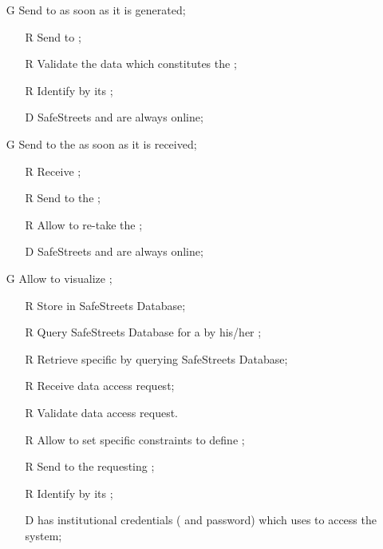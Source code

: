 \documentclass[../../../rasd.tex]{subfiles}
\begin{document}
\begin{itemize}
	\item[G\subs{2}]Send  to  as soon as it is generated;
	\begin{itemize}
		\item[R\subs{11}]Send  to ;
		\item[R\subs{15}]Validate the data which constitutes the ;
		\item[R\subs{31}]Identify  by its ;
		\\
		\item[D\subs{6}]SafeStreets and  are always online;	
	\end{itemize}

	\item[G\subs{3}]Send  to the  as soon as it is received;
	\begin{itemize}
		\item[R\subs{4}]Receive ;
		\item[R\subs{7}]Send  to the ;
		\item[R\subs{33}]Allow  to re-take the ;
		\\
		\item[D\subs{6}]SafeStreets and  are always online;
	\end{itemize}

	\item[G\subs{4}]Allow  to visualize ;
	\begin{itemize}
		\item[R\subs{10}]Store  in SafeStreets Database;
		\item[R\subs{13}]Query SafeStreets Database for a  by his/her ;
		\item[R\subs{14}]Retrieve specific  by querying SafeStreets Database; 
		\item[R\subs{16}]Receive  data access request;
		\item[R\subs{17}]Validate  data access request.
		\item[R\subs{18}]Allow  to set specific constraints to define ;
		\item[R\subs{19}]Send  to the requesting ;
		\item[R\subs{31}]Identify  by its ;
		\\
		\item[D\subs{7}] has institutional credentials ( and password) which uses to access the system;
	\end{itemize}


\end{itemize}
\end{document}
